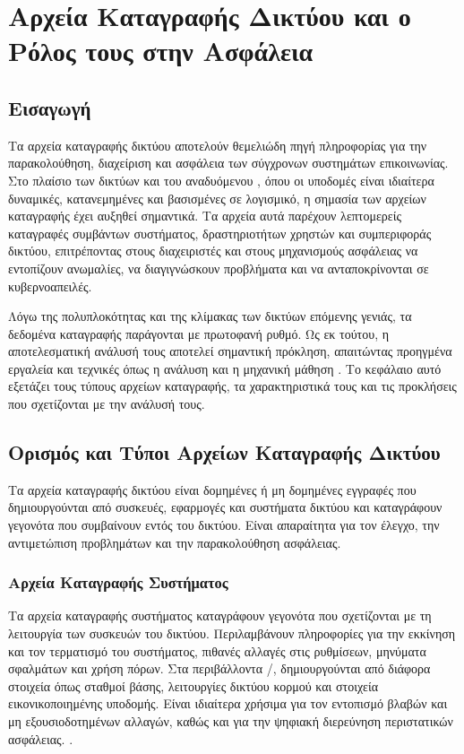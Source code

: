 \section{Αρχεία Καταγραφής Δικτύου και ο Ρόλος τους στην Ασφάλεια}

\subsection{Εισαγωγή}

Τα αρχεία καταγραφής δικτύου αποτελούν θεμελιώδη πηγή πληροφορίας για την παρακολούθηση, διαχείριση και ασφάλεια των σύγχρονων συστημάτων επικοινωνίας. Στο πλαίσιο των δικτύων  και του αναδυόμενου , όπου οι υποδομές είναι ιδιαίτερα δυναμικές, κατανεμημένες και βασισμένες σε λογισμικό, η σημασία των αρχείων καταγραφής έχει αυξηθεί σημαντικά. Τα αρχεία αυτά παρέχουν λεπτομερείς καταγραφές συμβάντων συστήματος, δραστηριοτήτων χρηστών και συμπεριφοράς δικτύου, επιτρέποντας στους διαχειριστές και στους μηχανισμούς ασφάλειας να εντοπίζουν ανωμαλίες, να διαγιγνώσκουν προβλήματα και να ανταποκρίνονται σε κυβερνοαπειλές.

Λόγω της πολυπλοκότητας και της κλίμακας των δικτύων επόμενης γενιάς, τα δεδομένα καταγραφής παράγονται με πρωτοφανή ρυθμό. Ως εκ τούτου, η αποτελεσματική ανάλυσή τους αποτελεί σημαντική πρόκληση, απαιτώντας προηγμένα εργαλεία και τεχνικές όπως η ανάλυση  και η μηχανική μάθηση \cite{behl2017cybersecurity}. Το κεφάλαιο αυτό εξετάζει τους τύπους αρχείων καταγραφής, τα χαρακτηριστικά τους και τις προκλήσεις που σχετίζονται με την ανάλυσή τους.

\subsection{Ορισμός και Τύποι Αρχείων Καταγραφής Δικτύου}

Τα αρχεία καταγραφής δικτύου είναι δομημένες ή μη δομημένες εγγραφές που δημιουργούνται από συσκευές, εφαρμογές και συστήματα δικτύου και καταγράφουν γεγονότα που συμβαίνουν εντός του δικτύου. Είναι απαραίτητα για τον έλεγχο, την αντιμετώπιση προβλημάτων και την παρακολούθηση ασφάλειας.

\subsubsection{Αρχεία Καταγραφής Συστήματος}

Τα αρχεία καταγραφής συστήματος καταγράφουν γεγονότα που σχετίζονται με τη λειτουργία των συσκευών του δικτύου. Περιλαμβάνουν πληροφορίες για την εκκίνηση και τον τερματισμό του συστήματος, πιθανές αλλαγές στις ρυθμίσεων, μηνύματα σφαλμάτων και χρήση πόρων. Στα περιβάλλοντα /, δημιουργούνται από διάφορα στοιχεία όπως σταθμοί βάσης, λειτουργίες δικτύου κορμού και στοιχεία εικονικοποιημένης υποδομής. Είναι ιδιαίτερα χρήσιμα για τον εντοπισμό βλαβών και μη εξουσιοδοτημένων αλλαγών, καθώς και για την ψηφιακή διερεύνηση περιστατικών ασφάλειας. \cite{xu2009detecting}.

